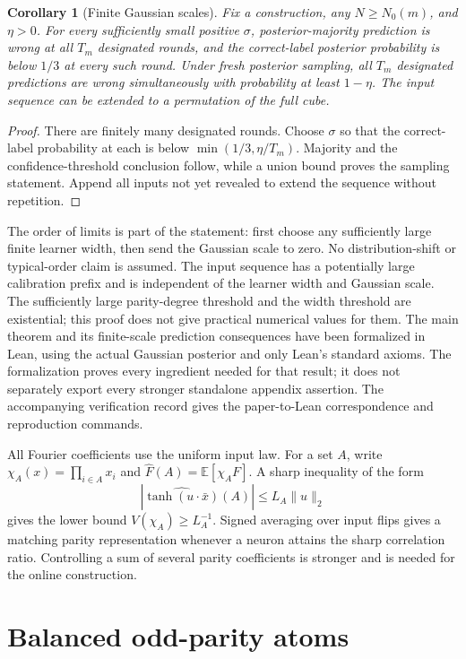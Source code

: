 \documentclass[11pt]{article}
\newtheorem{corollary}[theorem]{Corollary}
\theoremstyle{remark}\newtheorem{remark}[theorem]{Remark}
\newcommand{\E}{\mathbb E}\newcommand{\R}{\mathbb R}
\begin{document}
\begin{corollary}[Finite Gaussian scales]\label{cor:finite-scale}
Fix a construction, any $N\ge N_0(m)$, and $\eta>0$. For every
sufficiently small positive $\sigma$, posterior-majority prediction
is wrong at all $T_m$ designated rounds, and the correct-label
posterior probability is below $1/3$ at every such round.
Under fresh posterior sampling, all $T_m$ designated predictions are
wrong simultaneously with probability at least $1-\eta$.
The input sequence can be extended to a permutation of the full cube.
\end{corollary}
\begin{proof}
There are finitely many designated rounds. Choose $\sigma$ so that
the correct-label probability at each is below
$\min(1/3,\eta/T_m)$. Majority and the confidence-threshold conclusion
follow, while a union bound proves the sampling statement. Append
all inputs not yet revealed to extend the sequence without repetition.
\end{proof}

The order of limits is part of the statement: first choose any
sufficiently large finite learner width, then send the Gaussian scale
to zero. No distribution-shift or typical-order claim is assumed.
The input sequence has a potentially large calibration prefix and
is independent of the learner width and Gaussian scale. The sufficiently
large parity-degree threshold and the width threshold are existential;
this proof does not give practical numerical values for them. The
main theorem and its finite-scale prediction consequences have been
formalized in Lean, using the actual Gaussian posterior and only Lean's
standard axioms. The formalization proves every ingredient needed for
that result; it does not separately export every stronger standalone
appendix assertion. The accompanying verification record gives the
paper-to-Lean correspondence and reproduction commands.

All Fourier coefficients use the uniform input law. For a set $A$,
write $\chi_A(x)=\prod_{i\in A}x_i$ and
$\widehat F(A)=\E[\chi_A F]$. A sharp inequality of the form
\[
 |\widehat{\tanh(u\cdot\bar x)}(A)|\le L_A\|u\|_2
\]
gives the lower bound $V(\chi_A)\ge L_A^{-1}$. Signed averaging over
input flips gives a matching parity representation whenever a neuron
attains the sharp correlation ratio. Controlling a sum of several
parity coefficients is stronger and is needed for the online construction.

\section{Balanced odd-parity atoms}
\end{document}
